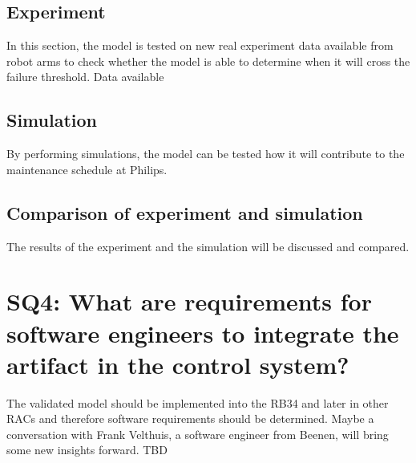 \subsection{Experiment} \label{Experiment}
In this section, the model is tested on new real experiment data available from robot arms to check whether the model is able to determine when it will cross the failure threshold. Data available 

\subsection{Simulation} \label{Simulation}
By performing simulations, the model can be tested how it will contribute to the maintenance schedule at Philips. 

\subsection{Comparison of experiment and simulation} \label{ExpvsSim}
The results of the experiment and the simulation will be discussed and compared.

\section{SQ4: What are requirements for software engineers to integrate the artifact in the control system?} \label{SQ4}
The validated model should be implemented into the RB34 and later in other RACs and therefore software requirements should be determined. Maybe a conversation with Frank Velthuis, a software engineer from Beenen, will bring some new insights forward. TBD

